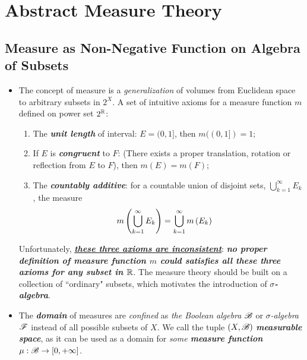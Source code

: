 \documentclass[11pt]{article}
\begin{document}
\newpage
\section{Abstract Measure Theory}
\subsection{Measure as Non-Negative Function on Algebra of Subsets}
\begin{itemize}
\item \begin{remark}
The concept of measure is a \emph{generalization} of volumes from Euclidean space to arbitrary subsets in $2^X$. \citep{tao2011introduction} A set of intuitive axioms for a measure function $m$ defined on power set $2^{{\mathbb R}}$: 
\begin{enumerate}
\item The \emph{\textbf{unit length}} of interval: $E= (0,1]$, then $m((0,1]) = 1$;
\item If $E$ is \emph{\textbf{congruent}} to $F$: (There exists a proper translation, rotation or reflection from $E$ to $F$), then $m(E) = m(F)$;
\item The \emph{\textbf{countably additive}}: for a countable union of disjoint sets, $\bigcup_{k=1}^{\infty}E_{k}$, the measure 
\begin{align*}
m\left(\bigcup_{k=1}^{\infty}E_{k}\right) &= \bigcup_{k=1}^{\infty}m\left(E_{k}\right)
\end{align*} 
\end{enumerate} 

Unfortunately, \underline{\emph{\textbf{these three axioms are inconsistent}}}: \emph{\textbf{no proper definition of measure function $m$ could satisfies all these three axioms for any subset in ${\mathbb R}$}}. The measure theory should be built on a collection of ``ordinary" subsets, which motivates the introduction of \emph{\textbf{$\sigma$-algebra}}. 
\end{remark}

\item \begin{remark}
The \textit{\textbf{domain}} of measures are \emph{confined} as \emph{the Boolean algebra} ${\mathscr B}$ or \emph{$\sigma$-algebra} ${\mathscr F}$ instead of all possible subsets of $X$. We call the tuple $(X, {\mathscr B})$  \emph{\textbf{measurable space}}, as it can be used as a domain for \emph{some \textbf{measure function}} $\mu: {\mathscr B} \rightarrow [0, +\infty]$.
\end{remark}


\end{itemize}
\end{document}
